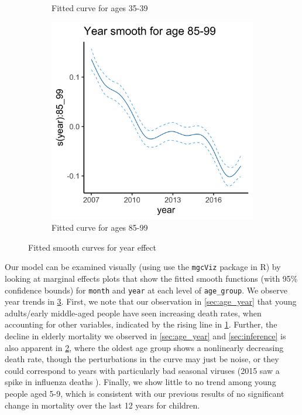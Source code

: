 \documentclass[11pt]{article}
\begin{document}
\begin{figure}
\begin{subfigure}[t]{0.32\textwidth}
\caption{Fitted curve  for ages 35-39}
\label{fig:gam_plot5}
\end{subfigure}
\begin{subfigure}[t]{0.32\textwidth}
\centering
\includegraphics[scale=0.077]{figs/gam_plot6.png}
\caption{Fitted curve for ages 85-99}
\label{fig:gam_plot6}
\end{subfigure}
\caption{Fitted smooth curves for year effect}
\label{fig:gam_year}
\end{figure} 

Our model can be examined visually (using use the \verb+mgcViz+ package in R\cite{mgcviz}) by looking at marginal effects plots that show the fitted smooth functions (with 95\% confidence bounds) for \verb+month+ and \verb+year+ at each level of \verb+age_group+.
We observe year trends in \cref{fig:gam_year}.
First, we note that our observation in \cref{sec:age_year} that young adults/early middle-aged people have seen increasing death rates, when accounting for other variables, indicated by the rising line in \cref{fig:gam_plot5}.
Further, the decline in elderly mortality we observed in \cref{sec:age_year} and \cref{sec:inference} is also apparent in \cref{fig:gam_plot6}, where the oldest age group shows a nonlinearly decreasing death rate, though the perturbations in the curve may just be noise, or they could correspond to years with particularly bad seasonal viruses (2015 saw a spike in influenza deaths \cite{cdc_flu}).
Finally, we show little to no trend among young people aged 5-9, which is consistent with our previous results of no significant change in mortality over the last 12 years for children.
\end{document}
